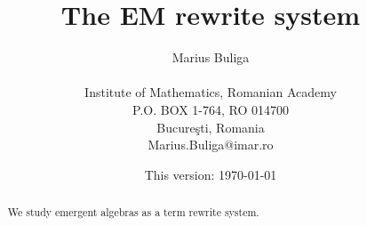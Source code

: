 \documentclass{article}
\begin{document}
\pagestyle{plain}










\newtheorem{theorem}{Theorem}[section]

\newtheorem{proposition}[theorem]{Proposition}

\newtheorem{lema}[theorem]{Lemma}

\newtheorem{corollary}[theorem]{Corollary}

\newtheorem{definition}[theorem]{Definition}

\newtheorem{remark}[theorem]{Remark}

\newtheorem{exempl}{Example}[section]

\newenvironment{example}{\begin{exempl}  \em}{\hfill $\square$

\end{exempl}}  \vspace{.5cm}









\renewcommand{\contentsname}{ }




\title{The EM rewrite system}

\author{Marius Buliga \\ 
\\
Institute of Mathematics, Romanian Academy \\
P.O. BOX 1-764, RO 014700\\
Bucure\c sti, Romania\\
{\footnotesize Marius.Buliga@imar.ro}}  \vspace{.5cm}







\date{This version: \today}






\maketitle


\begin{abstract}
We study emergent algebras as a term rewrite system. 

\end{abstract}
\end{document}
